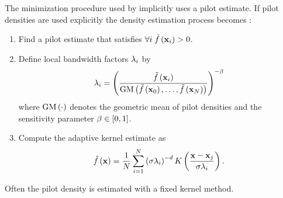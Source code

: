 The minimization procedure used by \citeauthor{breiman1977variable} implicitly uses a \KNN pilot estimate. If pilot densities are used explicitly the density estimation process becomes \cite{silverman1986density}:
	\begin{enumerate}[labelindent=0ex]
		\item Find a pilot estimate \varPilotDensityFunction{\varPattern} that satisfies $\forall i\; \varPilotDensityFunction{\varPattern[i]} > 0$. 

		\item Define local bandwidth factors $\lambda_{i}$ by
			\begin{equation}\label{eq:1:localBandwidth}
				\varLocalBandwidth{i} = \left( \frac{\varPilotDensityFunction{\varPattern[i]}}{\varGeometricMeanFunction{\varPilotDensityFunction{\varPattern[0]}, \dotsc, \varPilotDensityFunction{\varPattern[\varNumPatterns]}}}  \right)^{- \varMBESensitivityParam}
			\end{equation}
			where $\text{GM}\left(\cdot\right)$ denotes the geometric mean of pilot densities and the sensitivity parameter $\beta \in \left[0, 1\right]$.
		\item Compute the adaptive kernel estimate as
			\begin{equation}\label{eq:1:adaptiveKernelEstimateWithLocalBandwidths}
				\varEstimatedDensityFunction{\varPattern} = \frac{1}{\varNumPatterns} \sum_{i = 1}^{\varNumPatterns} \left(\varBandwidth\varLocalBandwidth{i}\right)^{-\varDim} \varKernel{\frac{\varPattern - \varPattern[j]}{\varBandwidth \varLocalBandwidth{i}}}.
			\end{equation}
	\end{enumerate}
Often the pilot density is estimated with a fixed kernel method. 

